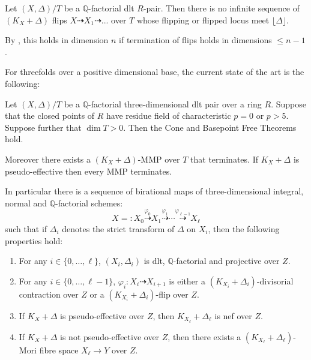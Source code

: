 \begin{conjecture}
	
	Let $(X,\Delta)/T$ be a $\mathbb{Q}$-factorial dlt $R$-pair. Then there is no infinite sequence of $(K_{X}+\Delta)$ flips $X \dashrightarrow X_{1} \dashrightarrow ...$ over $T$ whose flipping or flipped locus meet $\lfloor \Delta \rfloor$.
	
\end{conjecture}

By \cite[4.2.1]{fujino2007special}, this holds in dimension $n$ if termination of flips holds in dimensions $\leq n-1$.

For threefolds over a positive dimensional base, the current state of the art is the following:

	\begin{theorem}\cite{bhatt2020}\label{MMP}
	Let $(X, \Delta)/T$ be a $\mathbb{Q}$-factorial three-dimensional dlt pair over a ring $R$. Suppose that the closed points of $R$ have residue field of characteristic $p=0$ or $p> 5$. Suppose further that $\dim T >0$. Then the Cone and Basepoint Free Theorems hold.
	
	Moreover there exists a $(K_X+\Delta)$-MMP over $T$ that terminates. If $K_{X}+\Delta$ is pseudo-effective then every MMP terminates.
	
	In particular there is a sequence of birational maps of three-dimensional integral, normal and $\mathbb{Q}$-factorial schemes:  
	\[
	X=:X_0 \overset{\varphi_0}{\dashrightarrow} X_1 \overset{\varphi_1}{\dashrightarrow} \cdots \overset{\varphi_{\ell-1}}{\dashrightarrow} X_{\ell}
	\]
	such that if $\Delta_i$ denotes the strict transform of $\Delta$ on $X_i$, then
	the following properties hold:  
	\begin{enumerate}
		\item 
		For any $i \in \{0, \ldots, \ell\}$, 
		$(X_i, \Delta_i)$ is dlt, $\mathbb{Q}$-factorial and projective over $Z$.
		\item 
		For any $i \in \{0, \ldots, \ell-1\}$, 
		$\varphi_i\colon X_i \dashrightarrow X_{i+1}$ is either a $(K_{X_i}+\Delta_i)$-divisorial contraction over $Z$ or a $(K_{X_i}+\Delta_i)$-flip over $Z$. 
		\item 
		If $K_X+\Delta$ is pseudo-effective over $Z$, then $K_{X_{\ell}}+\Delta_{\ell}$ is nef over $Z$. 
		\item 
		If $K_X+\Delta$ is not pseudo-effective over $Z$, then 
		there exists a $(K_{X_{\ell}}+\Delta_{\ell})$-Mori fibre space $X_{\ell} \to Y$ over $Z$. 
	\end{enumerate}
\end{theorem}

